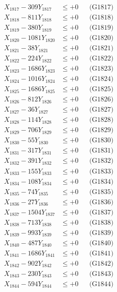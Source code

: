 \documentclass[a4paper,10pt]{article}
\begin{document}
{\begin{align}
X_{1817} - 309Y_{1817} &\leq +0 && \text{(G1817)} \\
X_{1818} - 811Y_{1818} &\leq +0 && \text{(G1818)} \\
X_{1819} - 380Y_{1819} &\leq +0 && \text{(G1819)} \\
X_{1820} - 1081Y_{1820} &\leq +0 && \text{(G1820)} \\
\allowbreak
X_{1821} - 38Y_{1821} &\leq +0 && \text{(G1821)} \\
X_{1822} - 224Y_{1822} &\leq +0 && \text{(G1822)} \\
X_{1823} - 1686Y_{1823} &\leq +0 && \text{(G1823)} \\
X_{1824} - 1016Y_{1824} &\leq +0 && \text{(G1824)} \\
X_{1825} - 1686Y_{1825} &\leq +0 && \text{(G1825)} \\
X_{1826} - 812Y_{1826} &\leq +0 && \text{(G1826)} \\
X_{1827} - 36Y_{1827} &\leq +0 && \text{(G1827)} \\
X_{1828} - 114Y_{1828} &\leq +0 && \text{(G1828)} \\
X_{1829} - 706Y_{1829} &\leq +0 && \text{(G1829)} \\
X_{1830} - 55Y_{1830} &\leq +0 && \text{(G1830)} \\
\allowbreak
X_{1831} - 317Y_{1831} &\leq +0 && \text{(G1831)} \\
X_{1832} - 391Y_{1832} &\leq +0 && \text{(G1832)} \\
X_{1833} - 155Y_{1833} &\leq +0 && \text{(G1833)} \\
X_{1834} - 108Y_{1834} &\leq +0 && \text{(G1834)} \\
X_{1835} - 74Y_{1835} &\leq +0 && \text{(G1835)} \\
X_{1836} - 27Y_{1836} &\leq +0 && \text{(G1836)} \\
X_{1837} - 1504Y_{1837} &\leq +0 && \text{(G1837)} \\
X_{1838} - 713Y_{1838} &\leq +0 && \text{(G1838)} \\
X_{1839} - 993Y_{1839} &\leq +0 && \text{(G1839)} \\
X_{1840} - 487Y_{1840} &\leq +0 && \text{(G1840)} \\
\allowbreak
X_{1841} - 1686Y_{1841} &\leq +0 && \text{(G1841)} \\
X_{1842} - 902Y_{1842} &\leq +0 && \text{(G1842)} \\
X_{1843} - 230Y_{1843} &\leq +0 && \text{(G1843)} \\
X_{1844} - 594Y_{1844} &\leq +0 && \text{(G1844)} \\

\end{align}}
\end{document}
